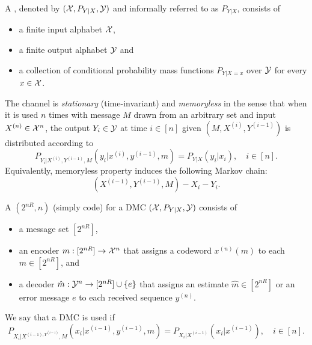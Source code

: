 \documentclass[11pt,a4paper]{article}
\begin{document}
\begin{definition}
    A , denoted by $(\mathcal{X},P_{Y|X},\mathcal{Y})$ and informally referred to as $P_{Y|X}$, consists of
    \begin{itemize}
        \item a finite input alphabet $\mathcal{X}$,
        \item a finite output alphabet $\mathcal{Y}$ and
        \item a collection of conditional probability mass functions $P_{Y|X = x}$ over $\mathcal{Y}$ for every $x\in\mathcal{X}$. 
    \end{itemize}
    The channel is \textit{stationary} (time-invariant) and \textit{memoryless} in the sense that when it is used $n$ times with message $M$ drawn from an arbitrary set and input $X^{(n)}\in\mathcal{X}^n$, the output $Y_i\in\mathcal{Y}$ at time $i\in[n]$ given $(M,X^{(i)},Y^{(i-1)})$ is distributed according to 
    \begin{equation*}
        P_{Y_i|X^{(i)},Y^{(i-1)},M}(y_i|x^{(i)},y^{(i-1)},m) = P_{Y|X}(y_i|x_i),\quad i\in[n].
    \end{equation*}
    Equivalently, memoryless property induces the following Markov chain:
    \begin{equation*}
        (X^{(i-1)},Y^{(i-1)},M) - X_i - Y_i.
    \end{equation*}
\end{definition}

\begin{definition}
    A $(2^{nR},n)$  (simply code) for a DMC $(\mathcal{X},P_{Y|X},\mathcal{Y})$ consists of 
    \begin{itemize}
        \item a message set $[2^{nR}]$,
        \item an encoder $m:[2^{nR}]\rightarrow \mathcal{X}^n$ that assigns a codeword $x^{(n)}(m)$ to each $m\in[2^{nR}]$, and
        \item a decoder $\hat{m}:\mathcal{Y}^n\rightarrow {[2^{nR}]}\cup \{e\}$ that assigns an estimate $\hat{m}\in[2^{nR}]$ or an error message $e$ to each received sequence $y^{(n)}$.
    \end{itemize}
\end{definition}

\begin{definition}
    We say that a DMC is used  if 
    \begin{equation*}
        P_{X_i|X^{(i-1),Y^{(i-1)}},M}(x_i|x^{(i-1)},y^{(i-1)},m) = P_{X_i|X^{(i-1)}}(x_i|x^{(i-1)}),\quad i\in[n].
    \end{equation*}
\end{definition}
\end{document}
